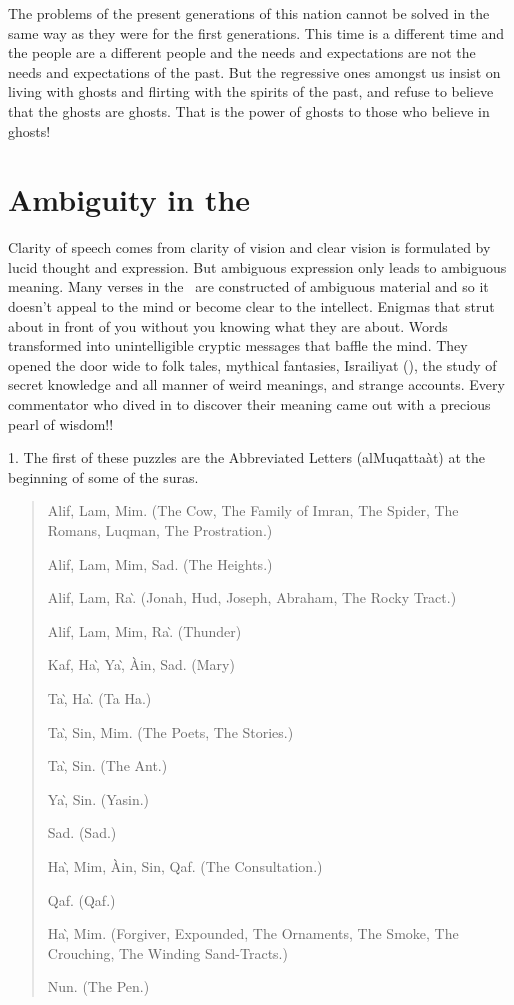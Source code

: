 \documentclass[12pt]{memoir}
\renewcommand\pardivider{\centerline{\ar{۞۞۞}}}
\begin{document}
The problems of the present generations of this nation cannot be solved
in the same way as they were for the first generations.
This time is a different time and the people are a different people
and the needs and expectations are not the needs and expectations of the past.
But the regressive ones amongst us insist on living with ghosts
and flirting with the spirits of the past,
and refuse to believe that the ghosts are ghosts.
That is the power of ghosts to those who believe in ghosts!

\pardivider


\section{Ambiguity in the \Quran}

Clarity of speech comes from clarity of vision
and clear vision is formulated by lucid thought and expression.
But ambiguous expression only leads to ambiguous meaning.
Many verses in the \Quran\ are constructed of ambiguous material
and so it doesn’t appeal to the mind or become clear to the intellect.
Enigmas that strut about in front of you
without you knowing what they are about.
Words transformed into unintelligible cryptic messages that baffle the mind.
They opened the door wide to folk tales, mythical fantasies, Isra\´iliyat
(),
the study of secret knowledge and all manner of weird meanings,
and strange accounts.
Every commentator who dived in to discover their meaning
came out with a precious pearl of wisdom!!

1. The first of these puzzles are the Abbreviated Letters (al\–Muqatta\`at)
at the beginning of some of the suras.

\begin{quote}
Alif, Lam, Mim.
(The Cow, The Family of \´Imran, The Spider,
The Romans, Luqman, The Prostration.)

Alif, Lam, Mim, Sad. (The Heights.)

Alif, Lam, Ra\`.
(Jonah, Hud, Joseph, Abraham, The Rocky Tract.)

Alif, Lam, Mim, Ra\`. (Thunder)

Kaf, Ha\`, Ya\`, \`Ain, Sad. (Mary)

Ta\`, Ha\`. (Ta Ha.)

Ta\`, Sin, Mim. (The Poets, The Stories.)

Ta\`, Sin. (The Ant.)

Ya\`, Sin. (Yasin.)

Sad. (Sad.)

Ha\`, Mim, \`Ain, Sin, Qaf. (The Consultation.)

Qaf. (Qaf.)

Ha\`, Mim.
(Forgiver, Expounded, The Ornaments, The Smoke,
The Crouching, The Winding Sand-Tracts.)

Nun. (The Pen.)
\end{quote}
\end{document}
